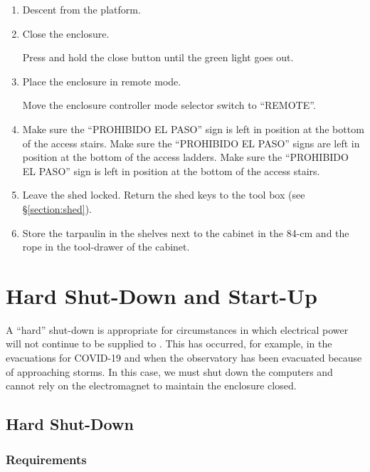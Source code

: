 \begin{enumerate}
    \item Descent from the platform.

    \item Close the enclosure.

        Press and hold the close button until the green light goes out.

    \item
        Place the enclosure in remote mode.

        Move the enclosure controller mode selector switch to “REMOTE”.

    \item
        \ifcoatli
        Make sure the “PROHIBIDO EL PASO” sign is left in position at the bottom of the access stairs.
        \fi
        \ifddoti
        Make sure the “PROHIBIDO EL PASO” signs are left in position at the bottom of the access ladders.
        \fi
        \ifquetzalcoatl
        Make sure the “PROHIBIDO EL PASO” sign is left in position at the bottom of the access stairs.
        \fi

    \item
        Leave the shed locked. Return the shed keys to the tool box (see \S\ref{section:shed}).

    \item
        Store the tarpaulin in the shelves next to the cabinet in the 84-cm and the rope in the tool-drawer of the cabinet.

\end{enumerate}

\section{Hard Shut-Down and Start-Up}

A “hard” shut-down is appropriate for circumstances in which electrical power will not continue to be supplied to {\projectname}. This has occurred, for example, in the evacuations for COVID-19 and when the observatory has been evacuated because of approaching storms. In this case, we must shut down the computers and cannot rely on the electromagnet to maintain the enclosure closed.

\subsection{Hard Shut-Down}

\subsubsection{Requirements}

